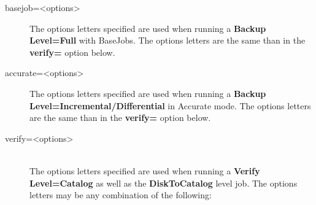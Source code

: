 \begin{description}
\item[basejob={\textless}options{\textgreater}]

The options letters specified are used when running a {\bf Backup Level=Full}
with BaseJobs. The options letters are the same than in the \textbf{verify=}
option below.

\item[accurate={\textless}options{\textgreater}] 
   The options letters specified are used when
  running a {\bf Backup Level=Incremental/Differential} in Accurate mode. The
  options letters are the same than in the \textbf{verify=} option below.

\item [verify={\textless}options{\textgreater}] \hfill \\
   The options letters specified are used  when running a {\bf Verify
   Level=Catalog} as well as the  {\bf DiskToCatalog} level job. The options
   letters may be any  combination of the following:

\end{description}
